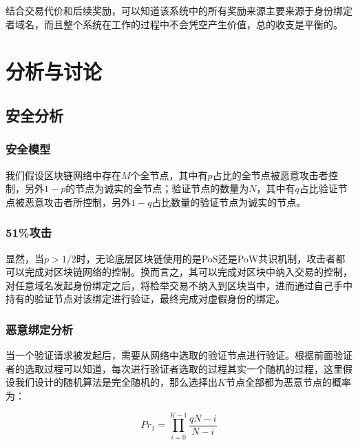 结合交易代价和后续奖励，可以知道该系统中的所有奖励来源主要来源于身份绑定者域名，而且整个系统在工作的过程中不会凭空产生价值，总的收支是平衡的。



\section{分析与讨论}


\subsection{安全分析}

\subsubsection{安全模型}

我们假设区块链网络中存在$M$个全节点，其中有$p$占比的全节点被恶意攻击者控制，另外$1-p$的节点为诚实的全节点；验证节点的数量为$N$，其中有$q$占比验证节点被恶意攻击者所控制，另外$1-q$占比数量的验证节点为诚实的节点。%

\subsubsection{51\%攻击}

显然，当$p > 1/2$时，无论底层区块链使用的是PoS还是PoW共识机制，攻击者都可以完成对区块链网络的控制。换而言之，其可以完成对区块中纳入交易的控制，对任意域名发起身份绑定之后，将检举交易不纳入到区块当中，进而通过自己手中持有的验证节点对该绑定进行验证，最终完成对虚假身份的绑定。

\subsubsection{恶意绑定分析}


当一个验证请求被发起后，需要从网络中选取的验证节点进行验证。根据前面验证者的选取过程可以知道，每次进行验证者选取的过程其实一个随机的过程，这里假设我们设计的随机算法是完全随机的，那么选择出$K$节点全部都为恶意节点的概率为：

\begin{equation}\label{Pr_1}
Pr_1 = \prod_{i=0}^{K-1}\frac{qN-i}{N-i}
\end{equation}

